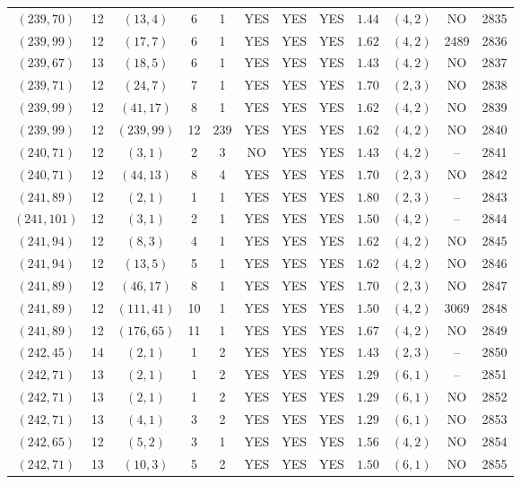\begin{longtable}{|c|c|c|c|c|c|c|c|c|c|c|c|}
$(239,70)$ & 12 & $(13,4)$ & 6 & 1 & YES & YES & YES & $1.44$ & $(4,2)$ & NO & 2835\\
$(239,99)$ & 12 & $(17,7)$ & 6 & 1 & YES & YES & YES & $1.62$ & $(4,2)$ & 2489 & 2836\\
$(239,67)$ & 13 & $(18,5)$ & 6 & 1 & YES & YES & YES & $1.43$ & $(4,2)$ & NO & 2837\\
$(239,71)$ & 12 & $(24,7)$ & 7 & 1 & YES & YES & YES & $1.70$ & $(2,3)$ & NO & 2838\\
$(239,99)$ & 12 & $(41,17)$ & 8 & 1 & YES & YES & YES & $1.62$ & $(4,2)$ & NO & 2839\\
$(239,99)$ & 12 & $(239,99)$ & 12 & 239 & YES & YES & YES & $1.62$ & $(4,2)$ & NO & 2840\\
$(240,71)$ & 12 & $(3,1)$ & 2 & 3 & NO & YES & YES & $1.43$ & $(4,2)$ & -- & 2841\\
$(240,71)$ & 12 & $(44,13)$ & 8 & 4 & YES & YES & YES & $1.70$ & $(2,3)$ & NO & 2842\\
$(241,89)$ & 12 & $(2,1)$ & 1 & 1 & YES & YES & YES & $1.80$ & $(2,3)$ & -- & 2843\\
$(241,101)$ & 12 & $(3,1)$ & 2 & 1 & YES & YES & YES & $1.50$ & $(4,2)$ & -- & 2844\\
$(241,94)$ & 12 & $(8,3)$ & 4 & 1 & YES & YES & YES & $1.62$ & $(4,2)$ & NO & 2845\\
$(241,94)$ & 12 & $(13,5)$ & 5 & 1 & YES & YES & YES & $1.62$ & $(4,2)$ & NO & 2846\\
$(241,89)$ & 12 & $(46,17)$ & 8 & 1 & YES & YES & YES & $1.70$ & $(2,3)$ & NO & 2847\\
$(241,89)$ & 12 & $(111,41)$ & 10 & 1 & YES & YES & YES & $1.50$ & $(4,2)$ & 3069 & 2848\\
$(241,89)$ & 12 & $(176,65)$ & 11 & 1 & YES & YES & YES & $1.67$ & $(4,2)$ & NO & 2849\\
$(242,45)$ & 14 & $(2,1)$ & 1 & 2 & YES & YES & YES & $1.43$ & $(2,3)$ & -- & 2850\\
$(242,71)$ & 13 & $(2,1)$ & 1 & 2 & YES & YES & YES & $1.29$ & $(6,1)$ & -- & 2851\\
$(242,71)$ & 13 & $(2,1)$ & 1 & 2 & YES & YES & YES & $1.29$ & $(6,1)$ & NO & 2852\\
$(242,71)$ & 13 & $(4,1)$ & 3 & 2 & YES & YES & YES & $1.29$ & $(6,1)$ & NO & 2853\\
$(242,65)$ & 12 & $(5,2)$ & 3 & 1 & YES & YES & YES & $1.56$ & $(4,2)$ & NO & 2854\\
$(242,71)$ & 13 & $(10,3)$ & 5 & 2 & YES & YES & YES & $1.50$ & $(6,1)$ & NO & 2855\\

\end{longtable}
